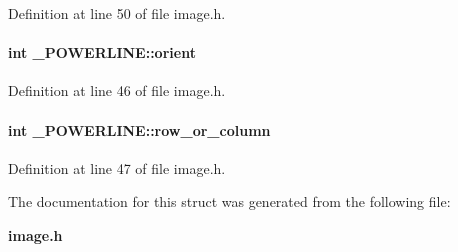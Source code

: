 Definition at line 50 of file image.h.\label{_POWERLINE_m0}
\paragraph{\setlength{\rightskip}{0pt plus 5cm}int \_\-POWERLINE::orient}\hfill



Definition at line 46 of file image.h.\label{_POWERLINE_m1}
\paragraph{\setlength{\rightskip}{0pt plus 5cm}int \_\-POWERLINE::row\_\-or\_\-column}\hfill



Definition at line 47 of file image.h.

The documentation for this struct was generated from the following file:\begin{CompactItemize}
\item 
{\bf image.h}\end{CompactItemize}
